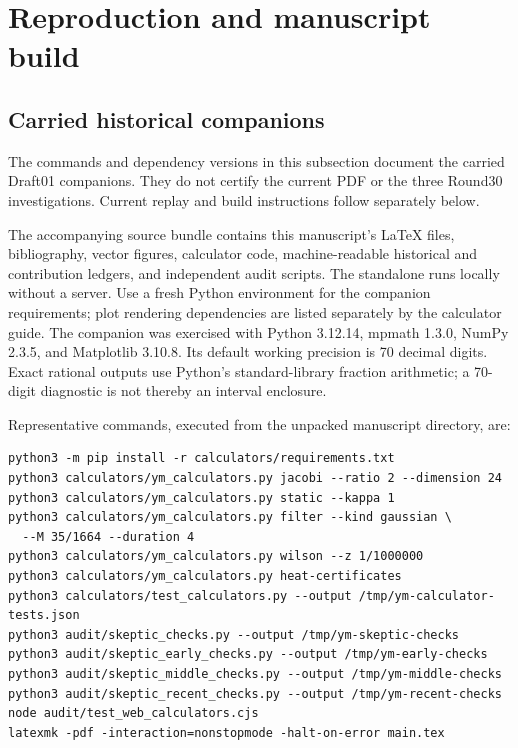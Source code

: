 \section{Reproduction and manuscript build}
\label{app:reproduction}

\subsection{Carried historical companions}
The commands and dependency versions in this subsection document the carried Draft01 companions. They do not certify the current PDF or the three Round30 investigations. Current replay and build instructions follow separately below.

The accompanying source bundle contains this manuscript's \LaTeX{} files, bibliography, vector figures, calculator code, machine-readable historical and contribution ledgers, and independent audit scripts. The standalone  runs locally without a server. Use a fresh Python environment for the companion requirements; plot rendering dependencies are listed separately by the calculator guide.
The companion was exercised with Python 3.12.14, mpmath 1.3.0, NumPy 2.3.5, and Matplotlib 3.10.8. Its default working precision is 70 decimal digits. Exact rational outputs use Python's standard-library fraction arithmetic; a 70-digit diagnostic is not thereby an interval enclosure.

Representative commands, executed from the unpacked manuscript directory, are:
\begin{verbatim}
python3 -m pip install -r calculators/requirements.txt
python3 calculators/ym_calculators.py jacobi --ratio 2 --dimension 24
python3 calculators/ym_calculators.py static --kappa 1
python3 calculators/ym_calculators.py filter --kind gaussian \
  --M 35/1664 --duration 4
python3 calculators/ym_calculators.py wilson --z 1/1000000
python3 calculators/ym_calculators.py heat-certificates
python3 calculators/test_calculators.py --output /tmp/ym-calculator-tests.json
python3 audit/skeptic_checks.py --output /tmp/ym-skeptic-checks
python3 audit/skeptic_early_checks.py --output /tmp/ym-early-checks
python3 audit/skeptic_middle_checks.py --output /tmp/ym-middle-checks
python3 audit/skeptic_recent_checks.py --output /tmp/ym-recent-checks
node audit/test_web_calculators.cjs
latexmk -pdf -interaction=nonstopmode -halt-on-error main.tex
\end{verbatim}

